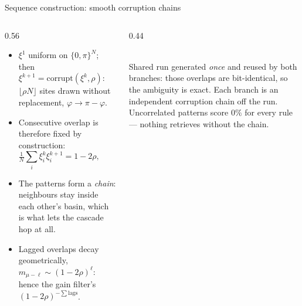 \documentclass[aspectratio=169]{beamer}
\newcommand{\xxi}{\xi}
\newcommand{\mvar}{m}
\begin{document}
\begin{frame}{Sequence construction: smooth corruption chains}
  \begin{columns}[T]
    \begin{column}{0.56\textwidth}
      \begin{itemize}
        \item $\xxi^{1}$ uniform on $\{0,\pi\}^N$; then
          $\xxi^{k+1} = \mathrm{corrupt}(\xxi^{k},\rho)$: $\lfloor \rho N \rfloor$ sites
          drawn without replacement, $\varphi \to \pi - \varphi$.
        \item Consecutive overlap is therefore fixed by construction:
          \[
            \tfrac1N \textstyle\sum_i \xxi^{k}_i \xxi^{k+1}_i = 1 - 2\rho,
            \qquad d(\xxi^k,\xxi^{k+1}) = 2\rho .
          \]
        \item The patterns form a \emph{chain}: neighbours stay inside each
          other's basin, which is what lets the cascade hop at all.
        \item Lagged overlaps decay geometrically,
          $\mvar_{\mu-\ell} \sim (1-2\rho)^{\ell}$: hence the gain filter's
          $(1-2\rho)^{-\sum\text{lags}}$.
      \end{itemize}
    \end{column}
    \begin{column}{0.44\textwidth}
      \centering
      \\[2mm]
      {\scriptsize Shared run generated \emph{once} and reused by both branches: those
      overlaps are bit-identical, so the ambiguity is exact. Each branch is an
      independent corruption chain off the run.}
      \\[2mm]
      {\scriptsize Uncorrelated patterns score $0\%$ for every rule --- nothing
      retrieves without the chain.}
    \end{column}
  \end{columns}
\end{frame}
\end{document}
